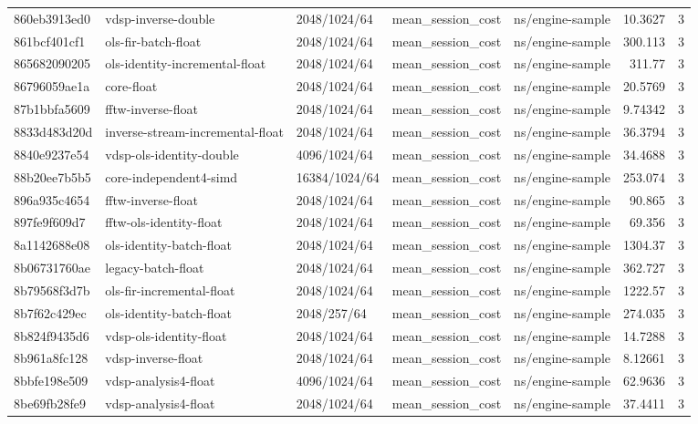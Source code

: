 \begin{longtable}{lllllrr}
860eb3913ed0 & vdsp-inverse-double & 2048/1024/64 & mean\_session\_cost & ns/engine-sample & 10.3627 & 3 \\
861bcf401cf1 & ols-fir-batch-float & 2048/1024/64 & mean\_session\_cost & ns/engine-sample & 300.113 & 3 \\
865682090205 & ols-identity-incremental-float & 2048/1024/64 & mean\_session\_cost & ns/engine-sample & 311.77 & 3 \\
86796059ae1a & core-float & 2048/1024/64 & mean\_session\_cost & ns/engine-sample & 20.5769 & 3 \\
87b1bbfa5609 & fftw-inverse-float & 2048/1024/64 & mean\_session\_cost & ns/engine-sample & 9.74342 & 3 \\
8833d483d20d & inverse-stream-incremental-float & 2048/1024/64 & mean\_session\_cost & ns/engine-sample & 36.3794 & 3 \\
8840e9237e54 & vdsp-ols-identity-double & 4096/1024/64 & mean\_session\_cost & ns/engine-sample & 34.4688 & 3 \\
88b20ee7b5b5 & core-independent4-simd & 16384/1024/64 & mean\_session\_cost & ns/engine-sample & 253.074 & 3 \\
896a935c4654 & fftw-inverse-float & 2048/1024/64 & mean\_session\_cost & ns/engine-sample & 90.865 & 3 \\
897fe9f609d7 & fftw-ols-identity-float & 2048/1024/64 & mean\_session\_cost & ns/engine-sample & 69.356 & 3 \\
8a1142688e08 & ols-identity-batch-float & 2048/1024/64 & mean\_session\_cost & ns/engine-sample & 1304.37 & 3 \\
8b06731760ae & legacy-batch-float & 2048/1024/64 & mean\_session\_cost & ns/engine-sample & 362.727 & 3 \\
8b79568f3d7b & ols-fir-incremental-float & 2048/1024/64 & mean\_session\_cost & ns/engine-sample & 1222.57 & 3 \\
8b7f62c429ec & ols-identity-batch-float & 2048/257/64 & mean\_session\_cost & ns/engine-sample & 274.035 & 3 \\
8b824f9435d6 & vdsp-ols-identity-float & 2048/1024/64 & mean\_session\_cost & ns/engine-sample & 14.7288 & 3 \\
8b961a8fc128 & vdsp-inverse-float & 2048/1024/64 & mean\_session\_cost & ns/engine-sample & 8.12661 & 3 \\
8bbfe198e509 & vdsp-analysis4-float & 4096/1024/64 & mean\_session\_cost & ns/engine-sample & 62.9636 & 3 \\
8be69fb28fe9 & vdsp-analysis4-float & 2048/1024/64 & mean\_session\_cost & ns/engine-sample & 37.4411 & 3 \\

\end{longtable}

